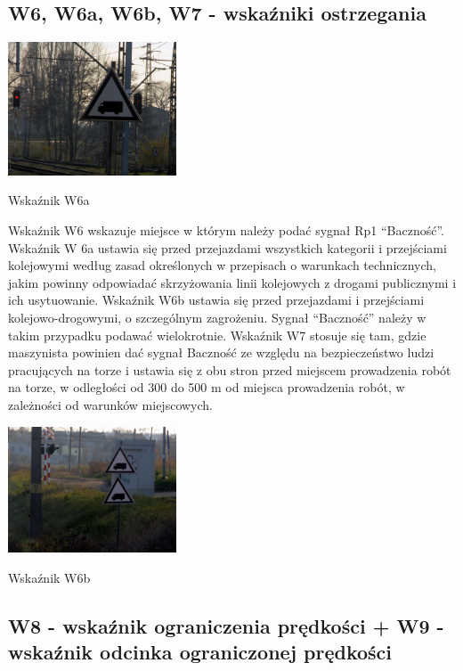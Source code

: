 \subsection{W6, W6a, W6b, W7 - wskaźniki ostrzegania}
	\begin{marginfigure}
	\includegraphics[width=5cm]{skryptkierownik-img/skryptkierownik-img010.jpg}
	\caption{Wskaźnik W6a}
\end{marginfigure}
Wskaźnik W6 wskazuje miejsce w którym należy podać sygnał Rp1 “Baczność”. Wskaźnik W 6a ustawia się przed przejazdami wszystkich kategorii i przejściami kolejowymi według zasad określonych w przepisach o warunkach technicznych, jakim powinny odpowiadać skrzyżowania linii kolejowych z drogami publicznymi i ich usytuowanie. Wskaźnik W6b ustawia się przed przejazdami i przejściami kolejowo-drogowymi, o szczególnym zagrożeniu. Sygnał “Baczność” należy w takim przypadku podawać wielokrotnie. Wskaźnik W7 stosuje się tam, gdzie maszynista powinien dać sygnał {\textquotedbl}Baczność{\textquotedbl} ze względu na bezpieczeństwo ludzi pracujących na torze i ustawia się z obu stron przed miejscem prowadzenia robót na torze, w odległości od 300 do 500 m od miejsca prowadzenia robót, w zależności od warunków miejscowych.
	\begin{marginfigure}
		\includegraphics[width=5cm]{skryptkierownik-img/skryptkierownik-img011.jpg}
		\caption{Wskaźnik W6b}
	\end{marginfigure}

\subsection{W8 - wskaźnik ograniczenia prędkości + W9 - wskaźnik odcinka ograniczonej prędkości}

